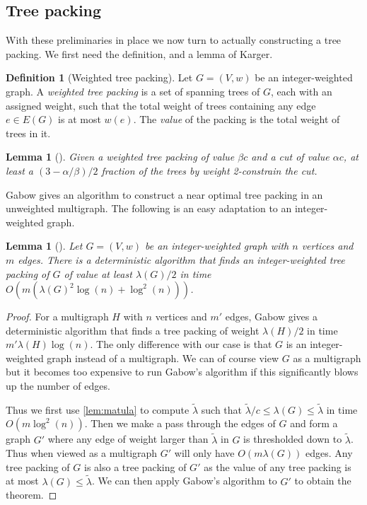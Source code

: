\documentclass[10pt,a4paper]{article}
\newcommand{\1}{\mathbf{1}}
\newtheorem{lemma}[theorem]{Lemma}
\theoremstyle{definition}
\newtheorem{definition}[theorem]{Definition}
\begin{document}
\subsection{Tree packing}
With these preliminaries in place we now turn to actually constructing a tree packing.  We first need the definition, and a lemma of Karger.
\begin{definition}[Weighted tree packing]
Let $G = (V,w)$ be an integer-weighted graph.  A \emph{weighted tree packing} is a set of spanning trees of $G$, each with an assigned weight, such that 
the total weight of trees containing any edge $e \in E(G)$ is at most $w(e)$.  The \emph{value} of the packing is the total weight of trees in it.  
\end{definition}

\begin{lemma}[{\cite[Lemma 2.3]{Karger00}}]
\label{lem:frac_trees}
Given a weighted tree packing of value $\beta c$ and a cut of value $\alpha c$, at least a $(3-\alpha/\beta)/2$ fraction of the trees by weight 2-constrain the cut.
\end{lemma}

Gabow gives an algorithm to construct a near optimal tree packing in an unweighted multigraph.  The following is an easy adaptation to an integer-weighted graph.
\begin{lemma}[\cite{Gabow95}]
\label{lem:tree_packing}
Let $G = (V,w)$ be an integer-weighted graph with $n$ vertices and $m$ edges.  There is a deterministic algorithm that finds an integer-weighted tree packing of $G$ of value at least 
$\lambda(G)/2$ in time $O(m (\lambda(G)^2 \log(n) + \log^2(n)))$.  
\end{lemma}

\begin{proof}
For a multigraph $H$ with $n$ vertices and $m'$ edges, Gabow \cite{Gabow95} gives a deterministic algorithm that finds a tree packing of weight $\lambda(H)/2$ in time 
$m' \lambda(H) \log(n)$.  The only difference with our case is that $G$ is an integer-weighted graph instead of a multigraph.  We can of course view $G$ as a multigraph but it 
becomes too expensive to run Gabow's algorithm if this significantly blows up the number of edges.  

Thus we first use \cref{lem:matula} to compute $\tilde \lambda$ such that $\tilde \lambda/c \le \lambda(G) \le \tilde \lambda$ in time $O(m \log^2(n))$.  Then we make a pass through the 
edges of $G$ and form a graph $G'$ where any edge of weight larger than $\tilde \lambda$ in $G$ is thresholded down to $\tilde \lambda$.  Thus when viewed as a multigraph $G'$ will only have $O(m \lambda(G))$ edges.  Any tree packing of $G$ is also a tree packing of $G'$ as the value of any tree packing is at most $\lambda(G) \le \tilde \lambda$.  We can then apply Gabow's algorithm to $G'$ to obtain the theorem.
\end{proof}
\end{document}
